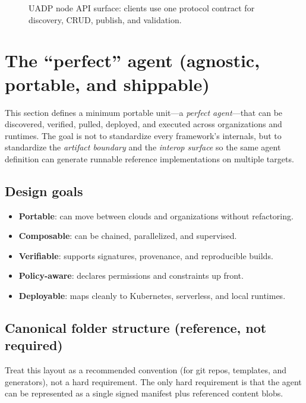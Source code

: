 \documentclass[11pt]{article}
\begin{document}
\begin{figure}[htbp]
\begin{center}
\end{center}
  \caption{UADP node API surface: clients use one protocol contract for discovery, CRUD, publish, and validation.}
\end{figure}

\section{The ``perfect'' agent (agnostic, portable, and shippable)}
This section defines a minimum portable unit---a \emph{perfect agent}---that can be discovered, verified, pulled, deployed, and executed across organizations and runtimes. The goal is not to standardize every framework's internals, but to standardize the \emph{artifact boundary} and the \emph{interop surface} so the same agent definition can generate runnable reference implementations on multiple targets.

\subsection{Design goals}
\begin{itemize}
  \item \textbf{Portable}: can move between clouds and organizations without refactoring.
  \item \textbf{Composable}: can be chained, parallelized, and supervised.
  \item \textbf{Verifiable}: supports signatures, provenance, and reproducible builds.
  \item \textbf{Policy-aware}: declares permissions and constraints up front.
  \item \textbf{Deployable}: maps cleanly to Kubernetes, serverless, and local runtimes.
\end{itemize}

\subsection{Canonical folder structure (reference, not required)}
Treat this layout as a recommended convention (for git repos, templates, and generators), not a hard requirement. The only hard requirement is that the agent can be represented as a single signed manifest plus referenced content blobs.
\end{document}
